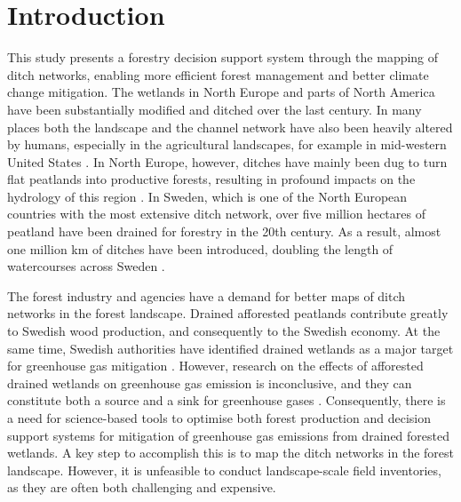 \documentclass[11pt, review]{elsarticle} %
\begin{document}
\newpage
\section{Introduction}\label{introduction}

This study presents a forestry decision support system through the mapping of ditch networks, enabling more efficient forest management and better climate change mitigation. The wetlands in North Europe and parts of North America have been substantially modified and ditched over the last century. In many places both the landscape and the channel network have also been heavily altered  by humans, especially in the agricultural landscapes, for example in mid-western United States \citep{passalacqua}. In North Europe, however, ditches have mainly been dug to turn flat peatlands into productive forests, resulting in profound impacts on the hydrology of this region \citep{peatlands}. In Sweden, which is one of the North European countries with the most extensive ditch network, over five million hectares of peatland have been drained for forestry in the 20th century. As a result, almost one million km of ditches have been introduced, doubling the length of watercourses across Sweden \citep{hasselquist}.

The forest industry and agencies have a demand for better maps of ditch networks in the forest landscape. Drained afforested peatlands contribute greatly to Swedish wood production, and consequently to the Swedish economy. At the same time, Swedish authorities have identified drained wetlands as a major target for greenhouse gas mitigation \citep{greenhouse_skogsstyrelsen, greenhouse_jordbruksverket}. However, research on the effects of afforested drained wetlands on greenhouse gas emission is inconclusive, and they can constitute both a source and a sink for greenhouse gases \citep{greenhouse_yes, greenhouse_no}. Consequently, there is a need for science-based tools to optimise both forest production and decision support systems for mitigation of greenhouse gas emissions from drained forested wetlands. A key step to accomplish this is to map the ditch networks in the forest landscape. However, it is unfeasible to conduct landscape-scale field inventories, as they are often both challenging and expensive.
\end{document}
